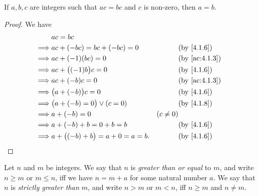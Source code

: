 \begin{cor}\label{4.1.9}
  If \(a, b, c\) are integers such that \(ac = bc\) and \(c\) is non-zero, then \(a = b\).
\end{cor}

\begin{proof}
  We have
  \begin{align*}
             & ac = bc                                                                            \\
    \implies & ac + (-bc) = bc + (-bc) = 0             &            & \by{4.1.6}                  \\
    \implies & ac + (-1)(bc) = 0                       &            & \text{(by \cref{ac:4.1.3})} \\
    \implies & ac + \big((-1)b\big)c = 0               &            & \by{4.1.6}                  \\
    \implies & ac + (-b)c = 0                          &            & \text{(by \cref{ac:4.1.3})} \\
    \implies & \big(a + (-b)\big)c = 0                 &            & \by{4.1.6}                  \\
    \implies & \big(a + (-b) = 0\big) \lor (c = 0)     &            & \by{4.1.8}                  \\
    \implies & a + (-b) = 0                            & (c \neq 0)                               \\
    \implies & a + (-b) + b = 0 + b = b                &            & \by{4.1.6}                  \\
    \implies & a + \big((-b) + b\big) = a + 0 = a = b. &            & \by{4.1.6}
  \end{align*}
\end{proof}

\begin{defn}\label{4.1.10}
  Let \(n\) and \(m\) be integers.
  We say that \(n\) is \emph{greater than or equal} to \(m\), and write \(n \geq m\) or \(m \leq n\), iff we have \(n = m + a\) for some natural number \(a\).
  We say that \(n\) is \emph{strictly greater than} \(m\), and write \(n > m\) or \(m < n\), iff \(n \geq m\) and \(n \neq m\).
\end{defn}

